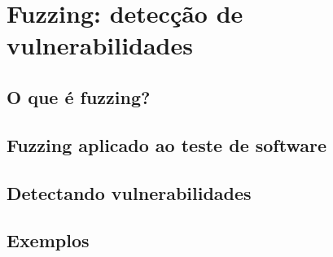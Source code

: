 
\chapter{Fuzzing: detecção de vulnerabilidades}
\label{chap:fuzzing}

	\section{O que é fuzzing?}

	\section{Fuzzing aplicado ao teste de software}

	\section{Detectando vulnerabilidades}

	\section{Exemplos}

